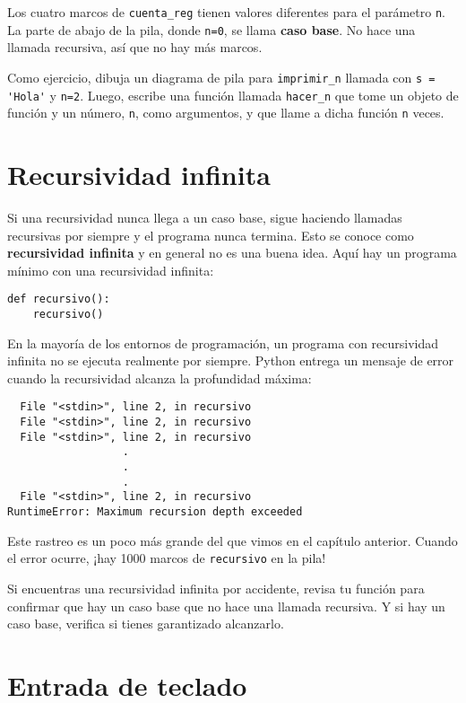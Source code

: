 \documentclass[10pt]{book}
\begin{document}
Los cuatro marcos de {\tt cuenta\_reg} tienen valores diferentes para el
parámetro {\tt n}.  La parte de abajo de la pila, donde {\tt n=0}, se
llama {\bf caso base}.  No hace una llamada recursiva, así que
no hay más marcos.

Como ejercicio, dibuja un diagrama de pila para \verb"imprimir_n" llamada con
\verb"s = 'Hola'" y {\tt n=2}.
Luego, escribe una función llamada \verb"hacer_n" que tome un objeto de
función y un número, {\tt n}, como argumentos, y que llame
a dicha función {\tt n} veces.


\section{Recursividad infinita}

Si una recursividad nunca llega a un caso base, sigue haciendo
llamadas recursivas por siempre y el programa nunca termina.  Esto se
conoce como {\bf recursividad infinita} y en general no es
una buena idea.  Aquí hay un programa mínimo con una recursividad infinita:

\begin{verbatim}
def recursivo():
    recursivo()
\end{verbatim}
%
En la mayoría de los entornos de programación, un programa con recursividad infinita
no se ejecuta realmente por siempre.  Python entrega un
mensaje de error cuando la recursividad alcanza la profundidad máxima:

\begin{verbatim}
  File "<stdin>", line 2, in recursivo
  File "<stdin>", line 2, in recursivo
  File "<stdin>", line 2, in recursivo
                  .
                  .
                  .
  File "<stdin>", line 2, in recursivo
RuntimeError: Maximum recursion depth exceeded
\end{verbatim}
%
Este rastreo es un poco más grande del que vimos en el
capítulo anterior.  Cuando el error ocurre, ¡hay 1000
marcos de {\tt recursivo} en la pila!

Si encuentras una recursividad infinita por accidente, revisa
tu función para confirmar que hay un caso base que no
hace una llamada recursiva.  Y si hay un caso base, verifica si
tienes garantizado alcanzarlo.


\section{Entrada de teclado}
\end{document}
